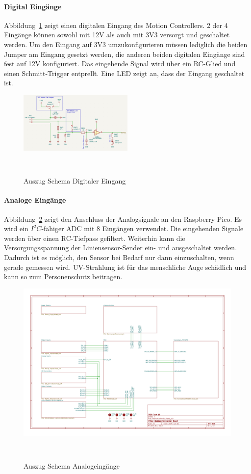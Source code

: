 \documentclass[main.  tex]{subfiles} %
\begin{document}
\paragraph{Digital Eingänge}
Abbildung~\ref{fig:Schema_DInput} zeigt einen digitalen Eingang des Motion
Controllers. 2 der 4 Eingänge können sowohl mit 12V als auch mit 3V3 versorgt
und geschaltet werden. Um den Eingang auf 3V3 umzukonfigurieren müssen
lediglich die beiden Jumper am Eingang gesetzt werden, die anderen beiden
digitalen Eingänge sind fest auf 12V konfiguriert. Das eingehende Signal wird
über ein RC-Glied und einen Schmitt-Trigger entprellt. Eine LED zeigt an, dass
der Eingang geschaltet ist.

\begin{figure}[h!]
    \centering
    \includegraphics[width=0.5\textwidth]{./fig_Antriebe/Schema_DIN_Umschaltbar.png}
    \caption{Auszug Schema Digitaler Eingang}~\label{fig:Schema_DInput}
\end{figure}

\paragraph{Analoge Eingänge}
Abbildung~\ref{fig:Schema_AIn} zeigt den Anschluss der Analogsignale an den
Raspberry Pico. Es wird ein $I^2C$-fähiger ADC mit 8 Eingängen verwendet. Die
eingehenden Signale werden über einen RC-Tiefpass gefiltert. Weiterhin kann die
Versorgungsspannung der Liniensensor-Sender ein- und ausgeschaltet werden.
Dadurch ist es möglich, den Sensor bei Bedarf nur dann einzuschalten, wenn
gerade gemessen wird. UV-Strahlung ist für das menschliche Auge schädlich und
kann so zum Personenschutz beitragen.

\begin{figure}[h!]
    \centering
    \includegraphics[page=7,width=\textwidth]{../Anhang_pdfs/MotionController.pdf}
    \caption{Auszug Schema Analogeingänge}~\label{fig:Schema_AIn}
\end{figure}
\end{document}
